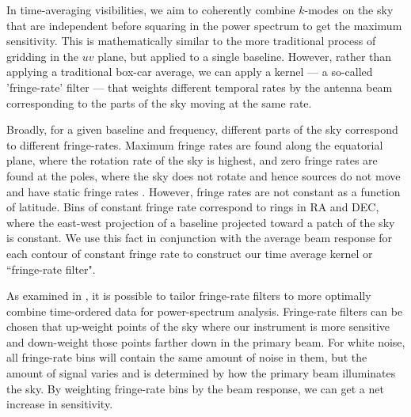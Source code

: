 \documentclass[twocolumn,numberedappendix]{emulateapj} \shorttitle{New Limits on the 21 cm Power Spectrum at $z=8.4$}
\begin{document}
In time-averaging visibilities,
we aim
to coherently combine  $k$-modes on the sky that are independent  before squaring in the power spectrum to get the maximum
sensitivity. This is mathematically similar to the more traditional process of
gridding in the $uv$ plane, but applied to a single baseline.  
However, rather
than applying a traditional box-car average, we can apply a kernel --- a so-called
'fringe-rate' filter --- that weights different temporal rates by the antenna
beam corresponding to the parts of the sky moving at the same rate.

Broadly, for a given baseline and frequency, different parts of the sky
correspond to different fringe-rates.  Maximum fringe rates are found along the
equatorial plane, where the rotation rate of the sky is highest, and zero
fringe rates are found at the poles, where the sky does not rotate and hence
sources do not move and have static fringe rates \citep{parsons_backer2009}.
However, fringe rates are not constant as a function of latitude. Bins of
constant fringe rate correspond to rings in RA and DEC, where
the east-west projection of a baseline projected toward a patch of the sky is
constant.  We use this fact in conjunction with the average beam response for each
contour of constant fringe rate to construct our time average kernel or
``fringe-rate filter".


%

As examined in \citet{parsons_et_al2015}, it is possible to tailor fringe-rate filters
to more optimally combine time-ordered data for power-spectrum analysis.
Fringe-rate filters can be chosen that
up-weight points of the sky where our instrument is more sensitive and down-weight
those points farther down in the primary beam. 
For white noise,
all fringe-rate bins will contain the same amount of noise in them, but the amount of signal
varies and is determined by how the primary beam illuminates the sky.
By weighting fringe-rate
bins by the beam response, we can get a net increase in sensitivity.  
\end{document}
